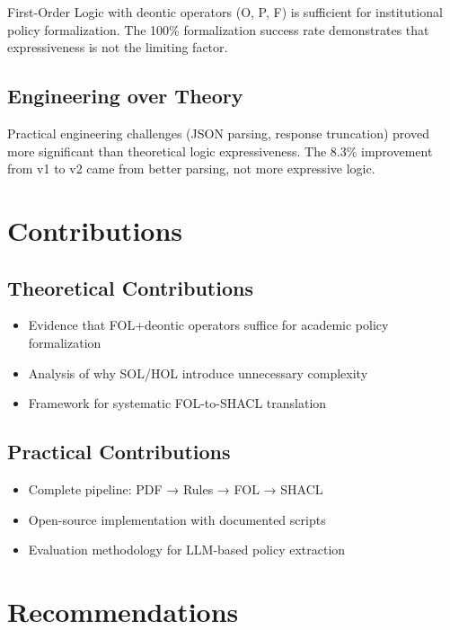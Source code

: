 First-Order Logic with deontic operators (O, P, F) is sufficient for institutional policy formalization. The 100\% formalization success rate demonstrates that expressiveness is not the limiting factor.

\subsection{Engineering over Theory}

Practical engineering challenges (JSON parsing, response truncation) proved more significant than theoretical logic expressiveness. The 8.3\% improvement from v1 to v2 came from better parsing, not more expressive logic.

\section{Contributions}

\subsection{Theoretical Contributions}

\begin{itemize}
    \item Evidence that FOL+deontic operators suffice for academic policy formalization
    \item Analysis of why SOL/HOL introduce unnecessary complexity
    \item Framework for systematic FOL-to-SHACL translation
\end{itemize}

\subsection{Practical Contributions}

\begin{itemize}
    \item Complete pipeline: PDF → Rules → FOL → SHACL
    \item Open-source implementation with documented scripts
    \item Evaluation methodology for LLM-based policy extraction
\end{itemize}

\section{Recommendations}

